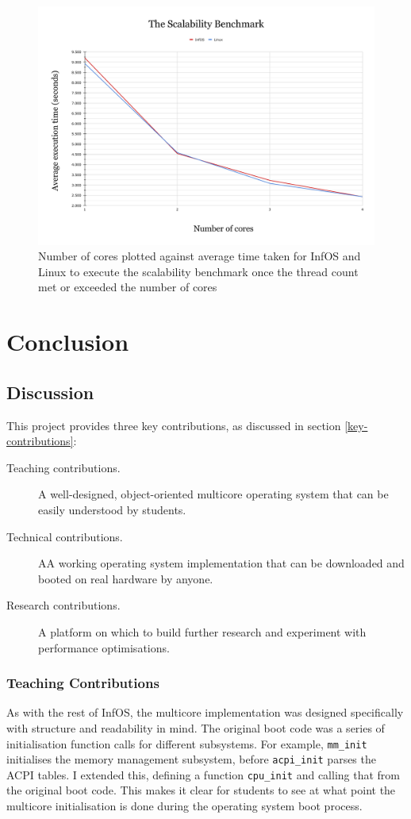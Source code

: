\documentclass[bsc,frontabs,singlespacing,parskip,deptreport]{infthesis}
\begin{document}
\begin{figure}[h]
    \centering
    \includegraphics[scale=0.3]{figures/scalability-graph.pdf}
    \caption{Number of cores plotted against average time taken for InfOS and Linux to execute the scalability benchmark once the thread count met or exceeded the number of cores}
    \label{scalability-graph}
\end{figure}

\chapter{Conclusion}
\section{Discussion}
This project provides three key contributions, as discussed in section \ref{key-contributions}:
\begin{description}
    \item [Teaching contributions.] A well-designed, object-oriented multicore operating system that can be easily understood by students.
    \item [Technical contributions.] AA working operating system implementation that can be downloaded and booted on real hardware by anyone.
    \item [Research contributions. ] A platform on which to build further research and experiment with performance optimisations.
\end{description}

\subsection{Teaching Contributions}
As with the rest of InfOS, the multicore implementation was designed specifically with structure and readability in mind. The original boot code was a series of initialisation function calls for different subsystems. For example, \verb|mm_init| initialises the memory management subsystem, before \verb|acpi_init| parses the ACPI tables. I extended this, defining a function \verb|cpu_init| and calling that from the original boot code. This makes it clear for students to see at what point the multicore initialisation is done during the operating system boot process.
\end{document}
